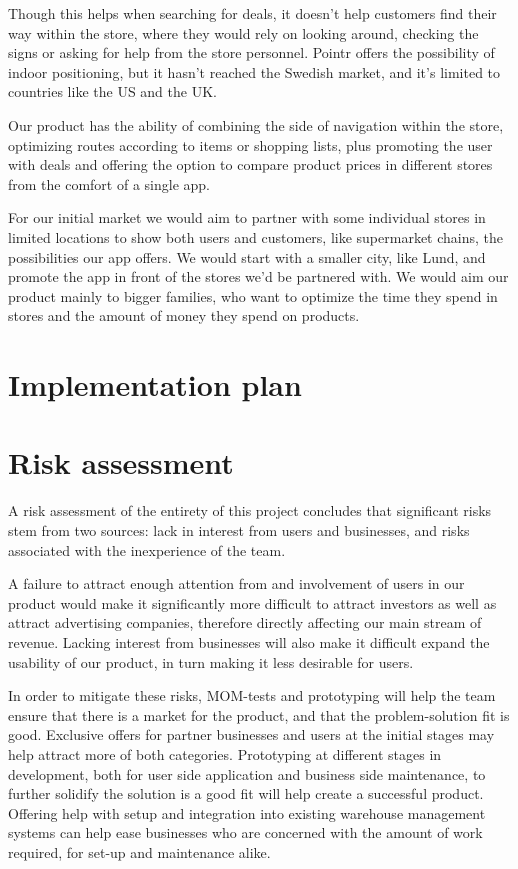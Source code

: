 \documentclass[titlepage]{article}
\begin{document}
Though this helps when searching for deals, it doesn’t help customers find their way within the store, where they would rely on looking around, checking the signs or asking for help from the store personnel. Pointr offers the possibility of indoor positioning, but it hasn’t reached the Swedish market, and it’s limited to countries like the US and the UK. 

Our product has the ability of combining the side of navigation within the store, optimizing routes according to items or shopping lists, plus promoting the user with deals and offering the option to compare product prices in different stores from the comfort of a single app.

For our initial market we would aim to partner with some individual stores in limited locations to show both users and customers, like supermarket chains, the possibilities our app offers. We would start with a smaller city, like Lund, and promote the app in front of the stores we’d be partnered with. We would aim our product mainly to bigger families, who want to optimize the time they spend in stores and the amount of money they spend on products.

\section{Implementation plan}

\section{Risk assessment}

A risk assessment of the entirety of this project concludes that significant risks stem from two sources: lack in interest from users and businesses, and risks associated with the inexperience of the team.

A failure to attract enough attention from and involvement of users in our product would make it significantly more difficult to attract investors as well as attract advertising companies, therefore directly affecting our main stream of revenue. Lacking interest from businesses will also make it difficult expand the usability of our product, in turn making it less desirable for users.

In order to mitigate these risks, MOM-tests and prototyping will help the team ensure that there is a market for the product, and that the problem-solution fit is good. Exclusive offers for partner businesses and users at the initial stages may help attract more of both categories. Prototyping at different stages in development, both for user side application and business side maintenance, to further solidify the solution is a good fit will help create a successful product. Offering help with setup and integration into existing warehouse management systems can help ease businesses who are concerned with the amount of work required, for set-up and maintenance alike. 
\end{document}
